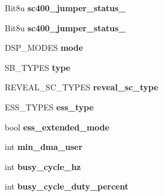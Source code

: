\begin{DoxyCompactItemize}
\item 
\hypertarget{structSB__INFO_aae0179c1f3b20ac340f4544ba4ea6560}{Bit8u {\bfseries sc400\-\_\-jumper\-\_\-status\-\_}}\label{structSB__INFO_aae0179c1f3b20ac340f4544ba4ea6560}

\item 
\hypertarget{structSB__INFO_a980ba41cb099a6747b318a991315296d}{Bit8u {\bfseries sc400\-\_\-jumper\-\_\-status\-\_}}\label{structSB__INFO_a980ba41cb099a6747b318a991315296d}

\item 
\hypertarget{structSB__INFO_a4d22bc8f6c24a3814c4661a49784f255}{D\-S\-P\-\_\-\-M\-O\-D\-E\-S {\bfseries mode}}\label{structSB__INFO_a4d22bc8f6c24a3814c4661a49784f255}

\item 
\hypertarget{structSB__INFO_a6f0cde17cf6ee98babdd4ea5ee039dba}{S\-B\-\_\-\-T\-Y\-P\-E\-S {\bfseries type}}\label{structSB__INFO_a6f0cde17cf6ee98babdd4ea5ee039dba}

\item 
\hypertarget{structSB__INFO_a2a34ca27331c49d79d31ca312c0b8c75}{R\-E\-V\-E\-A\-L\-\_\-\-S\-C\-\_\-\-T\-Y\-P\-E\-S {\bfseries reveal\-\_\-sc\-\_\-type}}\label{structSB__INFO_a2a34ca27331c49d79d31ca312c0b8c75}

\item 
\hypertarget{structSB__INFO_af16b072132123751a9a129202885e444}{E\-S\-S\-\_\-\-T\-Y\-P\-E\-S {\bfseries ess\-\_\-type}}\label{structSB__INFO_af16b072132123751a9a129202885e444}

\item 
\hypertarget{structSB__INFO_ae251dd3ee3617ec16606f42677f89e02}{bool {\bfseries ess\-\_\-extended\-\_\-mode}}\label{structSB__INFO_ae251dd3ee3617ec16606f42677f89e02}

\item 
\hypertarget{structSB__INFO_a4ed6c9e09bcaba006aefd7a1e35091f4}{int {\bfseries min\-\_\-dma\-\_\-user}}\label{structSB__INFO_a4ed6c9e09bcaba006aefd7a1e35091f4}

\item 
\hypertarget{structSB__INFO_a207522f8868849bed7f3c9895ade55e0}{int {\bfseries busy\-\_\-cycle\-\_\-hz}}\label{structSB__INFO_a207522f8868849bed7f3c9895ade55e0}

\item 
\hypertarget{structSB__INFO_a7bf942f873acf2277c2ccd8c48586b03}{int {\bfseries busy\-\_\-cycle\-\_\-duty\-\_\-percent}}\label{structSB__INFO_a7bf942f873acf2277c2ccd8c48586b03}


\end{DoxyCompactItemize}

